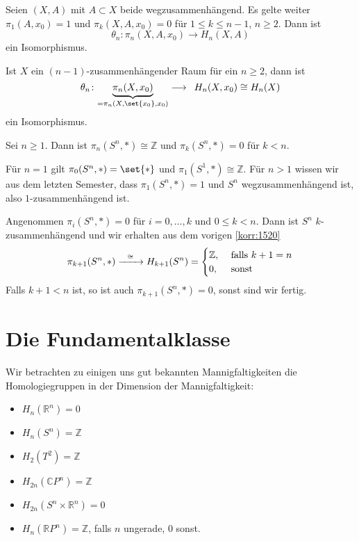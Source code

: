 \begin{satz}[{name={Hurewicz}}]
	Seien $(X,A)$ mit $A \subset X$ beide wegzusammenhängend. 
	Es gelte weiter $\pi_1(A,x_0)=1$ und $\pi_k(X,A,x_0)=0$ für $1 \le k \le n-1$, $n \ge 2$. Dann ist 
	\[
		\theta_n \colon \pi_n(X,A,x_0) \longrightarrow H_n(X,A)
	\]
	ein Isomorphismus.
\end{satz}

\begin{korollar}[{name=[{Isomorphie von Homotopie- und Homologiegruppen für $(n-1)$-zsmhg. Räume}]},label=korr:1520]
	Ist $X$ ein $(n-1)$-zusammenhängender Raum für ein $n \ge 2$, dann ist 
	\[
		\theta_n \colon \Underbrace{\pi_n(X,x_0)}{=\pi_n(X,\set{x_0},x_0)} \longrightarrow \enspace H_n(X,x_0)\cong H_n(X)
	\]
	ein Isomorphismus.
\end{korollar}

\begin{satz}[{name=[{Homotopiegruppen der Sphäre}]}]
	Sei $n \ge 1$. Dann ist $\pi_n(S^n,*)\cong \mathbb{Z}$ und $\pi_k(S^n,*)=0$ für $k <n$.
\end{satz}
\begin{beweis}
	Für $n=1$ gilt $\pi_0(S^n,*)= \set{*}$ und $\pi_1(S^1,*)\cong \mathbb{Z}$. Für $n>1$ wissen wir aus dem letzten Semester, dass $\pi_1(S^n,*)=1$ und $S^n$ wegzusammenhängend ist, also 
	$1$-zusammenhängend ist.

	Angenommen $\pi_i(S^n,*)=0$ für $i=0,\ldots ,k$ und $0 \le k < n$. Dann ist $S^n$ $k$-zusammenhängend und wir erhalten aus dem vorigen \autoref{korr:1520}
	\[
		\pi_{k+1}(S^n,*) \xrightarrow{\minwidthbox{\cong}{2em}} H_{k+1}(S^n)= \begin{cases}
			\mathbb{Z}, &\text{ falls }k+1=n\\
			0 , &\text{ sonst}
		\end{cases}
	\]
	Falls $k+1<n$ ist, so ist auch $\pi_{k+1}(S^n,*)=0$, sonst sind wir fertig.
\end{beweis}

\newpage
\section{Die Fundamentalklasse} %
\label{sec:16}
\begin{beispiel}[{name=[Homologiegruppen verschiedener Mannigfaltigkeiten]}]
	Wir betrachten zu einigen uns gut bekannten Mannigfaltigkeiten die Homologiegruppen in der Dimension der Mannigfaltigkeit:
	\begin{multicols}{2}
		\begin{itemize}
			\item $H_n(\mathbb{R}^n)=0$
			\item $H_n(S^n)=\mathbb{Z}$
			\item $H_2(T^2)=\mathbb{Z}$
			\item $H_{2n}(\mathbb{C}P^n)=\mathbb{Z}$
			\item $H_{2n}(S^n \times \mathbb{R}^n)=0$
			\item $H_n(\mathbb{R}P^n)=\mathbb{Z}$, falls $n$ ungerade, $0$ sonst.
		\end{itemize}
	\end{multicols}
\end{beispiel}

